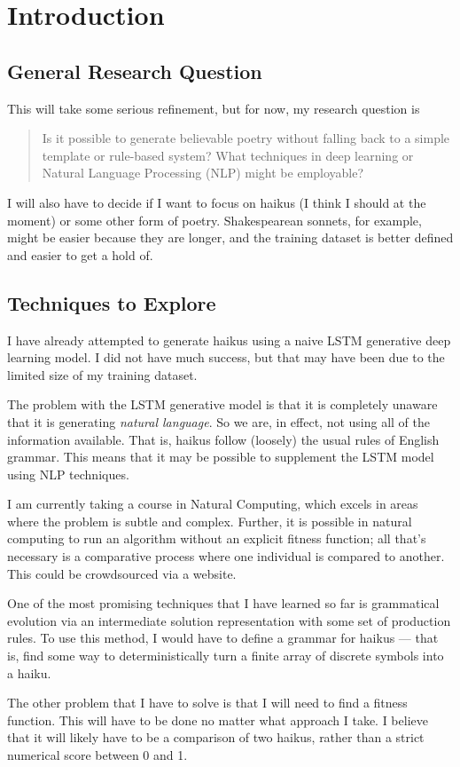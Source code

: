 \section{Introduction}\label{sec:introduction}

\subsection{General Research Question}\label{sec:research-question}

This will take some serious refinement, but for now, my research question is

\begin{quote}
    Is it possible to generate believable poetry without falling back to a simple template or
    rule-based system? What techniques in deep learning or Natural Language Processing (NLP) might
    be employable?
\end{quote}

I will also have to decide if I want to focus on haikus (I think I should at the moment) or some
other form of poetry. Shakespearean sonnets, for example, might be easier because they are longer,
and the training dataset is better defined and easier to get a hold of.

\subsection{Techniques to Explore}\label{sec:techniques-to-explore}

I have already attempted to generate haikus using a naive LSTM generative
deep learning model. I did not have much success, but that may have been due to the limited size of
my training dataset.

The problem with the LSTM generative model is that it is completely unaware that it is generating
\textit{natural language}. So we are, in effect, not using all of the information available. That
is, haikus follow (loosely) the usual rules of English grammar. This means that it may be possible
to supplement the LSTM model using NLP techniques.

I am currently taking a course in Natural Computing, which excels in areas
where the problem is subtle and complex. Further, it is possible in natural computing to run an
algorithm without an explicit fitness function; all that's necessary is a comparative process where
one individual is compared to another. This could be crowdsourced via a website.

One of the most promising techniques that I have learned so far is grammatical evolution via an
intermediate solution representation with some set of production rules. To use this method, I would
have to define a grammar for haikus --- that is, find some way to deterministically turn a finite
array of discrete symbols into a haiku.

The other problem that I have to solve is that I will need to find a fitness function. This will
have to be done no matter what approach I take. I believe that it will likely have to be a
comparison of two haikus, rather than a strict numerical score between 0 and 1.
